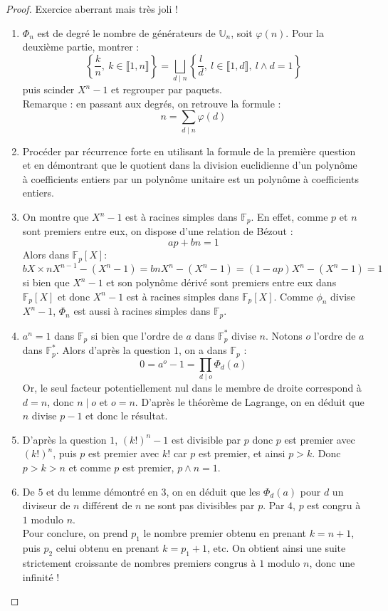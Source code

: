\documentclass[french]{article}
\newcommand{\U}{\mathbb{U}}
\newcommand{\st}{^*}
\newcommand{\F}{\mathbb{F}}
\theoremstyle{definition}
\begin{document}
\begin{proof}
	Exercice aberrant mais très joli !
	\begin{enumerate}
		\item $\Phi_n$ est de degré le nombre de générateurs de $\U_n$, soit $\varphi(n)$. Pour la deuxième partie, montrer : $$\left\{\frac{k}{n}, \ k\in\llbracket 1,n\rrbracket\right\}=\bigsqcup_{d\mid n}\left\{\frac{l}{d},\ l\in\llbracket1,d\rrbracket,\ l\wedge d=1\right\}$$ puis scinder $X^n-1$ et regrouper par paquets. \\ Remarque : en passant aux degrés, on retrouve la formule : $$n=\sum_{d\mid n}\varphi(d)$$
		\item Procéder par récurrence forte en utilisant la formule de la première question et en démontrant que le quotient dans la division euclidienne d'un polynôme à coefficients entiers par un polynôme unitaire est un polynôme à coefficients entiers.
		\item On montre que $X^n-1$ est à racines simples dans $\F_p$. En effet, comme $p$ et $n$ sont premiers entre eux, on dispose d'une relation de Bézout : $$ap+bn=1$$ Alors dans $\F_p[X]$: $$bX\times nX^{n-1}-(X^n-1)=bnX^n-(X^n-1)=(1-ap)X^n-(X^n-1)=1$$ si bien que $X^n-1$ et son polynôme dérivé sont premiers entre eux dans $\F_p[X]$ et donc $X^n-1$ est à racines simples dans $\F_p[X]$. Comme $\phi_n$ divise $X^n-1$, $\Phi_n$ est aussi à racines simples dans $\F_p$.
		\item $a^n=1$ dans $\F_p$ si bien que l'ordre de $a$ dans $\F_p\st$ divise $n$. Notons $o$ l'ordre de $a$ dans $\F_p\st$. Alors d'après la question $1$, on a dans $\F_p$ : $$0=a^o-1=\prod_{d\mid o}\Phi_d(a)$$ Or, le seul facteur potentiellement nul dans le membre de droite correspond à $d=n$, donc $n\mid o$ et $o=n$. D'après le théorème de Lagrange, on en déduit que $n$ divise $p-1$ et donc le résultat.
		\item D'après la question $1$, $(k!)^n-1$ est divisible par $p$ donc $p$ est premier avec $(k!)^n$, puis $p$ est premier avec $k!$ car $p$ est premier, et ainsi $p>k$. Donc $p>k>n$ et comme $p$ est premier, $p\wedge n=1$.
		\item De $5$ et du lemme démontré en $3$, on en déduit que les $\Phi_d(a)$ pour $d$ un diviseur de $n$ différent de $n$ ne sont pas divisibles par $p$. Par $4$, $p$ est congru à $1$ modulo $n$. \\ Pour conclure, on prend $p_1$ le nombre premier obtenu en prenant $k=n+1$, puis $p_2$ celui obtenu en prenant $k=p_1+1$, etc. On obtient ainsi une suite strictement croissante de nombres premiers congrus à $1$ modulo $n$, donc une infinité !
	\end{enumerate}
\end{proof}
\end{document}
